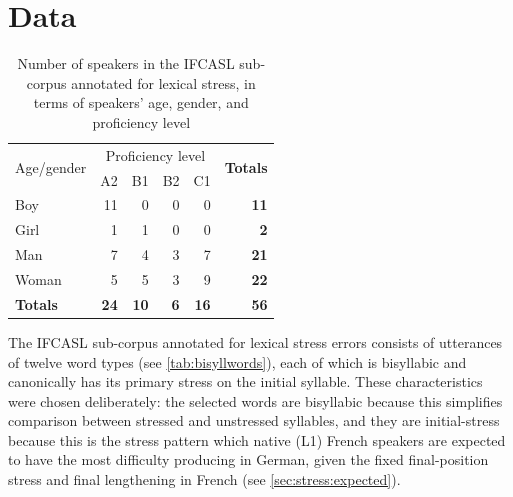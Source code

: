  
	
	
	
	\section{Data}
	\label{sec:lexstress:data}
	
	
	
		\begin{table}
			\centering
			\caption[Speakers in the annotated IFCASL sub-corpus]{Number of speakers in the IFCASL sub-corpus annotated for lexical stress, in terms of speakers' age, gender, and proficiency level}
			\begin{tabular}{lrrrrr}
			\toprule
			\multirow{2}{*}{Age/gender}	&	\multicolumn{4}{c}{Proficiency level} &\multirow{2}{*}{\textbf{Totals}}\\
			\cmidrule(lr){2-5}
		& A2	&	B1	&	B2	&	C1	&		\\
			\midrule
Boy	&	11	&	0	&	0	&	0	&	\textbf{11}	\\
Girl	&	1	&	1	&	0	&	0	&	\textbf{2}	\\
Man	&	7	&	4	&	3	&	7	&	\textbf{21}	\\
Woman	&	5	&	5	&	3	&	9	&	\textbf{22}	\\
\textbf{Totals}	&	\textbf{24}	&	\textbf{10}	&	\textbf{6}	&	\textbf{16}	&	\textbf{56}	\\
			\bottomrule
			\end{tabular}
			\label{tab:data:speakers}
		\end{table}
	
	
	The IFCASL sub-corpus annotated for lexical stress errors consists of utterances of twelve word types (see \cref{tab:bisyllwords}), each of which is bisyllabic and canonically has its primary stress on the initial syllable. These characteristics were chosen deliberately: the selected words are bisyllabic because this simplifies comparison between stressed and unstressed syllables, and they are initial-stress because this is the stress pattern which native (L1) French speakers are expected to have the most difficulty producing in German, given the fixed final-position stress and final lengthening in French (see \cref{sec:stress:expected}). 
	
